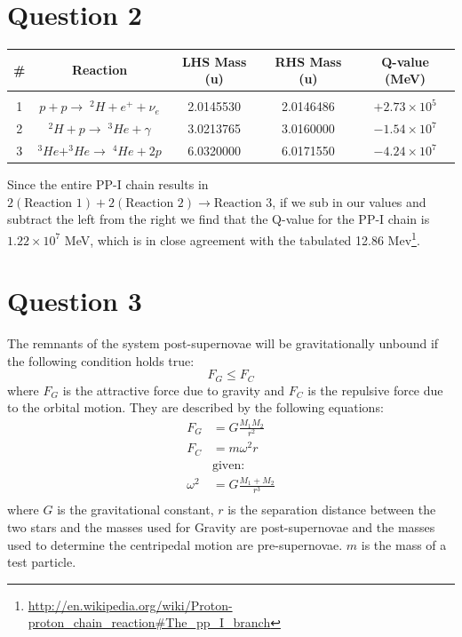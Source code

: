 \documentclass[10pt,a4paper]{article}
\begin{document}
\section*{Question 2}
\newcommand{\reactionOne}{$p + p \rightarrow \; ^{2}H + e^{+} + \nu_{e}$}
\newcommand{\reactionTwo}{$^{2}H + p \rightarrow \;^{3}He + \gamma$}
\newcommand{\reactionThree}{$^{3}He + ^{3}He \rightarrow \;^{4}He + 2p$}

\newcommand{\qvalueOne}{$+2.73 \times 10^{5}$}
\newcommand{\qvalueTwo}{$-1.54 \times 10^{7}$}
\newcommand{\qvalueThree}{$-4.24 \times 10^{7}$}

\begin{table}[h]
    \begin{tabular}{c|c|c|c|c}
        \#   &   Reaction            &   LHS Mass   (u)    &   RHS Mass (u)    &   Q-value (MeV) \\
        \hline \\
        1    &   \reactionOne{}      &   2.0145530         &   2.0146486       &   \qvalueOne{}  \\
        2    &   \reactionTwo{}      &   3.0213765         &   3.0160000       &   \qvalueTwo{}  \\
        3    &   \reactionThree{}    &   6.0320000         &   6.0171550       &   \qvalueThree{} \\
    \end{tabular}
\end{table}
Since the entire PP-I chain results in $2(\mbox{Reaction } 1) + 2(\mbox{Reaction } 2) \rightarrow \mbox{Reaction } 3$, if we sub in our values and subtract the left from the right we find that the Q-value for the PP-I chain is $1.22 \times 10^{7}$ MeV, which is in close agreement with the tabulated 12.86 Mev\footnote{\url{http://en.wikipedia.org/wiki/Proton-proton_chain_reaction#The_pp_I_branch}}.
\section*{Question 3}
The remnants of the system post-supernovae will be gravitationally unbound if the following condition holds true:
\begin{equation*}
    F_{G} \leq F_{C}
\end{equation*}
where $F_{G}$ is the attractive force due to gravity and $F_{C}$ is the repulsive force due to the orbital motion. They are described by the following equations:
\begin{align*}
    F_{G} &= G\frac{M_{1}M_{2}}{r^{2}} \\
    F_{C} &= m\omega^{2}r \\
    &\mbox{given:} \\
    \omega^{2} &= G\frac{M_{1}+M_{2}}{r^{3}} \\
\end{align*}
where $G$ is the gravitational constant, $r$ is the separation distance between the two stars and the masses used for Gravity are post-supernovae and the masses used to determine the centripedal motion are pre-supernovae. $m$ is the mass of a test particle.
\end{document}

